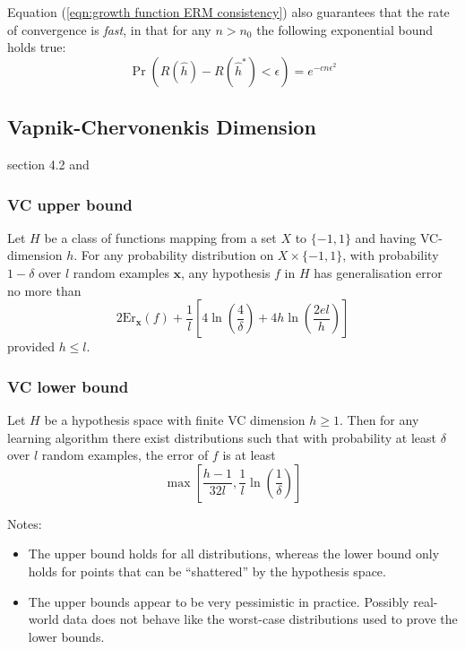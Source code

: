 Equation (\ref{eqn:growth function ERM consistency}) also guarantees
that the rate of convergence is \emph{fast}, in that for any $n >
n_0$ the following exponential bound holds true: 
\begin{equation}
\Pr \left( R(\hat{h}) - R(\hat{h}^{\ast}) < \epsilon \right) =
e^{-cn\epsilon^2}
\end{equation}
 


\subsection{Vapnik-Chervonenkis Dimension}
\cite{Cherkassky98} section 4.2 and \cite{Bartlett98a}

\subsubsection{VC upper bound}

Let $H$ be a class of functions mapping from a set $X$ to $\{-1, 1\}$
and having VC-dimension $h$.  For any probability distribution on $X
\times \{-1,1\}$, with probability $1-\delta$ over $l$ random examples
$\mathbf{x}$, any hypothesis $f$ in $H$ has generalisation error no
more than
\begin{equation}
2\mathrm{Er}_{\mathbf{x}}(f) + \frac{1}{l} \left[ 4 \ln 
\left( \frac{4}{\delta} \right) + 4 h \ln \left( \frac{2 e l}{h}
\right) \right]
\end{equation}
provided $h \leq l$.

\subsubsection{VC lower bound}

Let $H$ be a hypothesis space with finite VC dimension $h \geq 1$.
Then for any learning algorithm there exist distributions such that
with probability at least $\delta$ over $l$ random examples, the error
of $f$ is at least
\begin{equation}
\max \left[ \frac{h-1}{32l}, \frac{1}{l} \ln \left( \frac{1}{\delta}
\right) \right]
\end{equation}

\noindent Notes:

\begin{itemize}

\item	The upper bound holds for all distributions, whereas the lower
	bound only holds for points that can be ``shattered'' by the
	hypothesis space.

\item	The upper bounds appear to be very pessimistic in practice.
	Possibly real-world data does not behave like the worst-case
	distributions used to prove the lower bounds.

\end{itemize}


